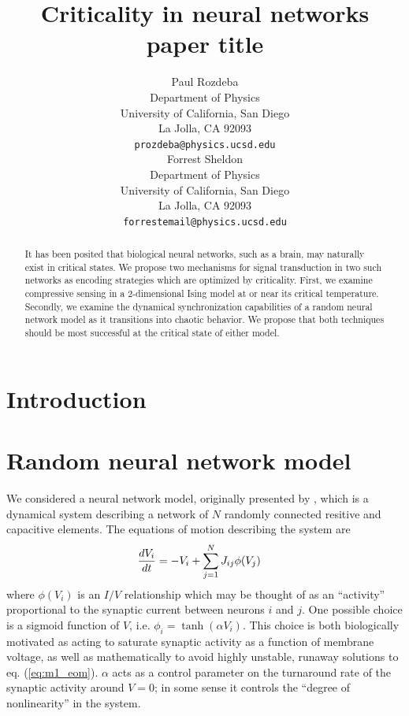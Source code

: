 \documentclass{article} %
\title{Criticality in neural networks paper title}
\author{
Paul Rozdeba%
\\
Department of Physics\\
University of California, San Diego\\
La Jolla, CA 92093 \\
\texttt{prozdeba@physics.ucsd.edu} \\
\And
Forrest Sheldon \\
Department of Physics\\
University of California, San Diego\\
La Jolla, CA 92093 \\
\texttt{forrestemail@physics.ucsd.edu} \\
}
\begin{document}
\maketitle

\begin{abstract}
It has been posited that biological neural networks, such as a brain, may naturally exist in critical states.  We propose two mechanisms for signal transduction in two such networks as encoding strategies which are optimized by criticality.  First, we examine compressive sensing in a 2-dimensional Ising model at or near its critical temperature.  Secondly, we examine the dynamical synchronization capabilities of a random neural network model as it transitions into chaotic behavior.  We propose that both techniques should be most successful at the critical state of either model.
\end{abstract}


\section{Introduction}



\section{Random neural network model}
We considered a neural network model, originally presented by \cite{Sompolinsky1988}, which is a dynamical system describing a network of $N$ randomly connected resitive and capacitive elements.  The equations of motion describing the system are
\begin{align}
	\frac{d V_i}{d t} &= -V_i + \sum_{j=1}^{N} J_{ij} \phi(V_j) \label{eq:m1_eom}
\end{align}
where $\phi(V_i)$ is an $I/V$ relationship which may be thought of as an ``activity'' proportional to the synaptic current between neurons $i$ and $j$.  One possible choice is a sigmoid function of $V$, i.e. $\phi_i = \tanh\left(\alpha V_i\right)$.  This choice is both biologically motivated as acting to saturate synaptic activity as a function of membrane voltage, as well as mathematically to avoid highly unstable, runaway solutions to eq. (\ref{eq:m1_eom}).  $\alpha$ acts as a control parameter on the turnaround rate of the synaptic activity around $V = 0$; in some sense it controls the ``degree of nonlinearity'' in the system.
\end{document}
